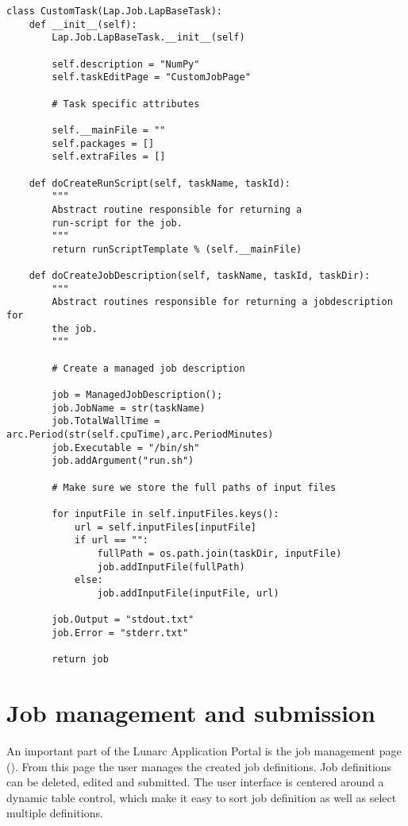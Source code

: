 \documentclass{book}
\newcommand{\python}[1]{\textbf{\sffamily{#1 }}}
\begin{document}
\begin{shaded}
\begin{verbatim}
class CustomTask(Lap.Job.LapBaseTask):
    def __init__(self):
        Lap.Job.LapBaseTask.__init__(self)
        
        self.description = "NumPy"
        self.taskEditPage = "CustomJobPage"

        # Task specific attributes
        
        self.__mainFile = ""      
        self.packages = []
        self.extraFiles = []
        
    def doCreateRunScript(self, taskName, taskId):
        """
        Abstract routine responsible for returning a
        run-script for the job.
        """
        return runScriptTemplate % (self.__mainFile)
        
    def doCreateJobDescription(self, taskName, taskId, taskDir):
        """
        Abstract routines responsible for returning a jobdescription for
        the job.
        """
        
        # Create a managed job description
        
        job = ManagedJobDescription();
        job.JobName = str(taskName)
        job.TotalWallTime = arc.Period(str(self.cpuTime),arc.PeriodMinutes)
        job.Executable = "/bin/sh"
        job.addArgument("run.sh")
        
        # Make sure we store the full paths of input files
        
        for inputFile in self.inputFiles.keys():
            url = self.inputFiles[inputFile]
            if url == "":
                fullPath = os.path.join(taskDir, inputFile)
                job.addInputFile(fullPath)
            else:
                job.addInputFile(inputFile, url)
        
        job.Output = "stdout.txt"
        job.Error = "stderr.txt"
        
        return job    
\end{verbatim}
\end{shaded}

\section{Job management and submission}

An important part of the Lunarc Application Portal is the job management page (\python{ManageJobPage}). From this page the user manages the created job definitions. Job definitions can be deleted, edited and submitted. The user interface is centered around a dynamic table control, which make it easy to sort job definition as well as select multiple definitions. 
\end{document}

